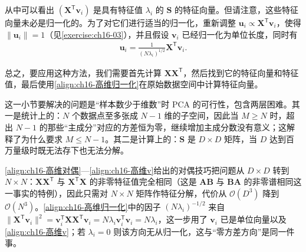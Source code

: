 \documentclass[../../main.tex]{subfiles}
\begin{document}
从中可以看出 $(\bm{X}^{\mathsf T}\bm{v}_i)$ 是具有特征值 $\lambda_i$ 的 $\bm{S}$ 的特征向量。但请注意，这些特征向量未必是归一化的。为了对它们进行适当的归一化，重新调整 $\bm{u}_i\propto\bm{X}^{\mathsf T}\bm{v}_i$，使得 $\|\bm{u}_i\|=1$（见\cref{exercise:ch16-03}），并且假设 $\bm{v}_i$ 已经归一化为单位长度，同时有
\begin{align}
  \bm{u}_i=\frac{1}{(N\lambda_i)^{1/2}}\bm{X}^{\mathsf T}\bm{v}_i.
  \label{align:ch16-高维归一化}
\end{align}

总之，要应用这种方法，我们需要首先计算 $\bm{X}\bm{X}^{\mathsf T}$，然后找到它的特征向量和特征值，最后使用\eqref{align:ch16-高维归一化}在原始数据空间中计算特征向量。

\begin{remark}
这一小节要解决的问题是“样本数少于维数”时 PCA 的可行性，包含两层困难。其一是统计上的：$N$ 个数据点至多张成 $N-1$ 维的子空间，因此当 $M\geqslant N$ 时，超出 $N-1$ 的那些“主成分”对应的方差恒为零，继续增加主成分数没有意义；这解释了为什么要求 $M\leqslant N-1$。其二是计算上的：$\bm{S}$ 是 $D\times D$ 矩阵，当 $D$ 达到百万量级时既无法存下也无法分解。

\eqref{align:ch16-高维对偶}—\eqref{align:ch16-高维v}给出的对偶技巧把问题从 $D\times D$ 转到 $N\times N$：$\bm{X}\bm{X}^{\mathsf T}$ 与 $\bm{X}^{\mathsf T}\bm{X}$ 的非零特征值完全相同（这是 $\bm{A}\bm{B}$ 与 $\bm{B}\bm{A}$ 的非零谱相同这一事实的特例），因此只需对 $N\times N$ 矩阵作特征分解，代价从 $\mathcal{O}(D^3)$ 降到 $\mathcal{O}(N^3)$。\eqref{align:ch16-高维归一化}中的因子 $(N\lambda_i)^{-1/2}$ 来自 $\|\bm{X}^{\mathsf T}\bm{v}_i\|^2=\bm{v}_i^{\mathsf T}\bm{X}\bm{X}^{\mathsf T}\bm{v}_i=N\lambda_i\bm{v}_i^{\mathsf T}\bm{v}_i=N\lambda_i$，这一步用了 $\bm{v}_i$ 已是单位向量以及\eqref{align:ch16-高维v}；若 $\lambda_i=0$ 则该方向无从归一化，这与“零方差方向”是同一件事。
\end{remark}
\end{document}
